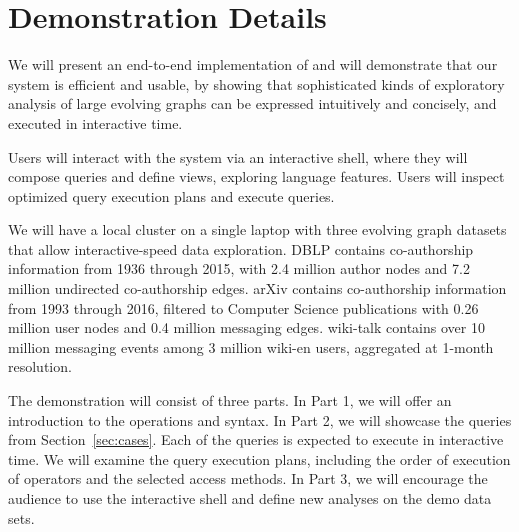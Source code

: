 \section{Demonstration Details}
\label{sec:demo}

We will present an end-to-end implementation of \sys and will
demonstrate that our system is efficient and usable, by showing that
sophisticated kinds of exploratory analysis of large evolving graphs
can be expressed intuitively and concisely, and executed in
interactive time.


Users will interact with the \sys system via an interactive shell,
where they will compose queries and define \tg views, exploring
language features.  Users will inspect optimized query execution plans
and execute queries.

We will have a local cluster on a single laptop with three evolving
graph datasets that allow interactive-speed data exploration. DBLP
contains co-authorship information from 1936 through 2015, with 2.4
million author nodes and 7.2 million undirected co-authorship edges.
arXiv contains co-authorship information from 1993 through 2016,
filtered to Computer Science publications with 0.26 million user nodes
and 0.4 million messaging edges.  wiki-talk contains over 10 million
messaging events among 3 million wiki-en users,
aggregated at 1-month resolution.



The demonstration will consist of three parts.  In Part 1, we will
offer an introduction to the \ql operations and syntax.  In Part 2, we
will showcase the queries from Section~\ref{sec:cases}.  Each of the
queries is expected to execute in interactive time.  We will examine the query execution plans, including
the order of execution of \tga operators and the selected access
methods.  In Part 3, we will encourage the audience to use the
interactive shell and define new analyses on the demo data sets.
